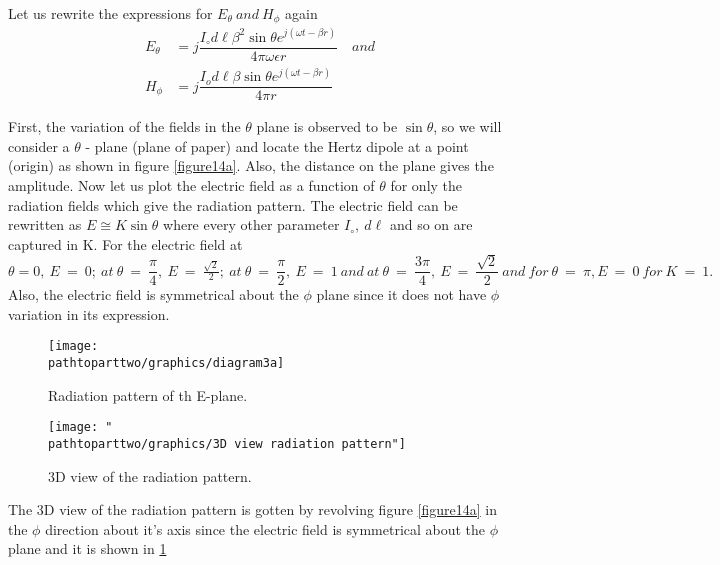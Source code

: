 \paragraph{}
Let us rewrite the expressions for $E_\theta \ and \ H_\phi$ again
\begin{align*}
E_\theta &= j\dfrac{I_\circ d\ell\beta^2\sin\theta e^{j(\omega t - \beta r)}}{4\pi\omega\epsilon r} \quad and 
\\
H_\phi &= j\dfrac{I_od\ell\beta\sin\theta e^{j(\omega t - \beta r)}}{4\pi r}
\end{align*}

First, the variation of the fields in the $\theta$ plane is observed to be $\sin\theta$, so we will consider a $\theta$ - plane (plane of paper) and locate the Hertz dipole at a point (origin) as shown in figure \ref{figure14a}. Also, the distance on the plane gives the amplitude. Now let us plot the electric field as a function of $\theta$ for only the radiation fields which give the radiation pattern. The electric field can be rewritten as $E \cong K\sin\theta$ where every other parameter $I_\circ, \ d\ell$ and so on are captured in K. For the electric field at $\theta = 0,\ E\ =\ 0;\ at\ \theta\ =\ \dfrac{\pi}{4},\ E\ =\ \frac{\sqrt{2}}{2};\ at\ \theta\ =\ \dfrac{\pi}{2},\ E\ =\ 1\ and\ at\ \theta\ =\ \dfrac{3\pi}{4},\ E\ =\ \dfrac{\sqrt{2}}{2}\ and\ for\ \theta\ =\ \pi, E\ =\ 0\ for\ K\ =\ 1. $
Also, the electric field is symmetrical about the $\phi$ plane since it does not have $\phi$ variation in its expression. 
\begin{figure}[!tbp]
\centering
\begin{minipage}[b]{0.4\textwidth}
\texttt{[image: \\pathtoparttwo/graphics/diagram3a]}
\caption{Radiation pattern of th E-plane.}
\label{figure14a}
\end{minipage}
\hfill
\begin{minipage}[b]{0.4\textwidth}
\texttt{[image: "\\pathtoparttwo/graphics/3D view radiation pattern"]}
\caption{3D view of the radiation pattern.}
\label{figure14b}
\end{minipage}
\end{figure}

The 3D view of the radiation pattern is gotten by revolving figure \ref{figure14a} in the $\phi$ direction about it's axis since the electric field is symmetrical about the $\phi$ plane and it is shown in \ref{figure14b}


